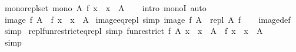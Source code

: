 \begin{isabellebody}
\endisatagproof
{\isafoldproof}%
%
\isadelimproof
\isanewline
%
\endisadelimproof
\isanewline
{}\isamarkupfalse%
\ mono{\isacharunderscore}{\kern0pt}repl{\isacharunderscore}{\kern0pt}set{\isacharcolon}{\kern0pt}\ {\isachardoublequoteopen}mono\ {\isacharparenleft}{\kern0pt}{\isasymlambda}A{\isachardot}{\kern0pt}\ {\isacharbraceleft}{\kern0pt}f\ x\ {\isacharbar}{\kern0pt}\ x\ {\isasymin}\ A{\isacharbraceright}{\kern0pt}{\isacharparenright}{\kern0pt}{\isachardoublequoteclose}\isanewline
%
\isadelimproof
\ \ %
\endisadelimproof
%
\isatagproof
{}\isamarkupfalse%
\ {\isacharparenleft}{\kern0pt}intro\ monoI{\isacharparenright}{\kern0pt}\ auto%
\endisatagproof
{\isafoldproof}%
%
\isadelimproof
%
\endisadelimproof
%
\isadelimdocument
%
\endisadelimdocument
%
\isatagdocument
%
\isamarkuptrue%
%
\endisatagdocument
{\isafolddocument}%
%
\isadelimdocument
%
\endisadelimdocument
{}\isamarkupfalse%
\ {\isachardoublequoteopen}image\ f\ A\ {\isasymequiv}\ {\isacharbraceleft}{\kern0pt}f\ x\ {\isacharbar}{\kern0pt}\ x\ {\isasymin}\ A{\isacharbraceright}{\kern0pt}{\isachardoublequoteclose}\isanewline
\isanewline
{}\isamarkupfalse%
\ image{\isacharunderscore}{\kern0pt}eq{\isacharunderscore}{\kern0pt}repl\ {\isacharbrackleft}{\kern0pt}simp{\isacharbrackright}{\kern0pt}{\isacharcolon}{\kern0pt}\ {\isachardoublequoteopen}image\ f\ A\ {\isacharequal}{\kern0pt}\ repl\ A\ f{\isachardoublequoteclose}\isanewline
%
\isadelimproof
\ \ %
\endisadelimproof
%
\isatagproof
{}\isamarkupfalse%
\ image{\isacharunderscore}{\kern0pt}def\ \isamarkupfalse%
\ simp%
\endisatagproof
{\isafoldproof}%
%
\isadelimproof
\isanewline
%
\endisadelimproof
\isanewline
{}\isamarkupfalse%
\ repl{\isacharunderscore}{\kern0pt}fun{\isacharunderscore}{\kern0pt}restrict{\isacharunderscore}{\kern0pt}eq{\isacharunderscore}{\kern0pt}repl\ {\isacharbrackleft}{\kern0pt}simp{\isacharbrackright}{\kern0pt}{\isacharcolon}{\kern0pt}\ {\isachardoublequoteopen}{\isacharbraceleft}{\kern0pt}fun{\isacharunderscore}{\kern0pt}restrict\ f\ A\ x\ {\isacharbar}{\kern0pt}\ x\ {\isasymin}\ A{\isacharbraceright}{\kern0pt}\ {\isacharequal}{\kern0pt}\ {\isacharbraceleft}{\kern0pt}f\ x\ {\isacharbar}{\kern0pt}\ x\ {\isasymin}\ A{\isacharbraceright}{\kern0pt}{\isachardoublequoteclose}\isanewline
%
\isadelimproof
\ \ %
\endisadelimproof
%
\isatagproof
{}\isamarkupfalse%
\ simp%
\endisatagproof
{\isafoldproof}%
%
\isadelimproof
\isanewline
%
\endisadelimproof
\isanewline
{}\isamarkupfalse%

\end{isabellebody}
